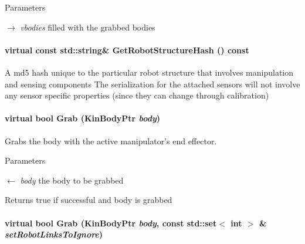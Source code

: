 \begin{DoxyParams}{Parameters}
\item[\mbox{$\rightarrow$} {\em vbodies}]filled with the grabbed bodies \end{DoxyParams}
\hypertarget{classOpenRAVE_1_1RobotBase_afe87e86a10bb78f6653dcd1a4558f07a}{
\paragraph[{GetRobotStructureHash}]{\setlength{\rightskip}{0pt plus 5cm}virtual const std::string\& GetRobotStructureHash () const}\hfill}
\label{classOpenRAVE_1_1RobotBase_afe87e86a10bb78f6653dcd1a4558f07a}
A md5 hash unique to the particular robot structure that involves manipulation and sensing components The serialization for the attached sensors will not involve any sensor specific properties (since they can change through calibration) \hypertarget{classOpenRAVE_1_1RobotBase_a233feb0353ba90cb2e60fea75043f364}{
\paragraph[{Grab}]{\setlength{\rightskip}{0pt plus 5cm}virtual bool Grab (KinBodyPtr {\em body})}\hfill}
\label{classOpenRAVE_1_1RobotBase_a233feb0353ba90cb2e60fea75043f364}


Grabs the body with the active manipulator's end effector. 


\begin{DoxyParams}{Parameters}
\item[\mbox{$\leftarrow$} {\em body}]the body to be grabbed \end{DoxyParams}
\begin{DoxyReturn}{Returns}
true if successful and body is grabbed 
\end{DoxyReturn}
\hypertarget{classOpenRAVE_1_1RobotBase_a922b8a6c3e70c59f28eb327b3c7f71f8}{
\paragraph[{Grab}]{\setlength{\rightskip}{0pt plus 5cm}virtual bool Grab (KinBodyPtr {\em body}, \/  const std::set$<$ int $>$ \& {\em setRobotLinksToIgnore})}\hfill}
\label{classOpenRAVE_1_1RobotBase_a922b8a6c3e70c59f28eb327b3c7f71f8}


